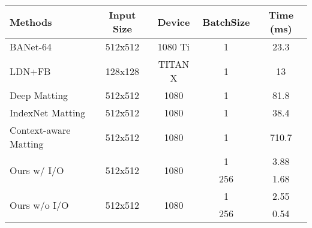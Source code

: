 \begin{table}[h]
	\centering
	\begin{tabular}{lcccc}  
		\toprule
		Methods & Input Size& Device & BatchSize & Time (ms)\\
		\midrule
		\midrule
		BANet-64\cite{chen2019boundary}& 512x512  & 1080 Ti& 1  & 23.3 \\
		\midrule
		LDN+FB\cite{zhu2017fast} &128x128 & TITAN X & 1& 13  \\
		\midrule
		\midrule
		Deep Matting\cite{xu2017deep}& 512x512  &  1080 & 1  & 81.8 \\
		\midrule
		IndexNet Matting\cite{lu2019indices} &512x512  &  1080 & 1  & 38.4 \\
		\midrule
		Context-aware Matting\cite{hou2019context}& 512x512  &  1080 & 1  & 710.7 \\
		\midrule
		\multirow{2}{*}{Ours w/ I/O}& \multirow{2}{*}{512x512} & \multirow{2}{*}{ 1080} &  1  & 3.88 \\
		&&&   256 & 1.68  \\
		\midrule
		\multirow{2}{*}{Ours w/o I/O}& \multirow{2}{*}{512x512} & \multirow{2}{*}{ 1080}  &  1 &  2.55  \\
		& && 256  & 0.54 \\
		\bottomrule
	\end{tabular}
	\label{tab6:time_gpu}
\end{table}
